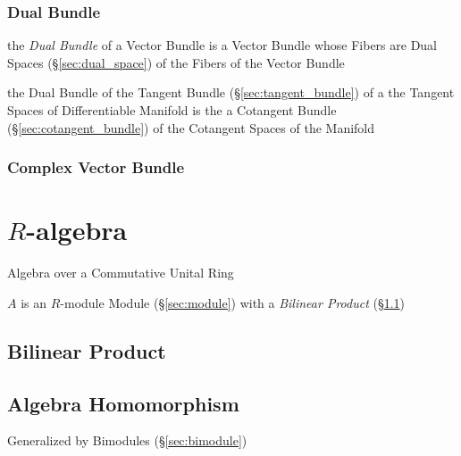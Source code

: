 \subsubsection{Dual Bundle}\label{sec:dual_bundle}

the \emph{Dual Bundle} of a Vector Bundle is a Vector Bundle whose Fibers are
Dual Spaces (\S\ref{sec:dual_space}) of the Fibers of the Vector Bundle

the Dual Bundle of the Tangent Bundle (\S\ref{sec:tangent_bundle}) of a the
Tangent Spaces of Differentiable Manifold is the a Cotangent Bundle
(\S\ref{sec:cotangent_bundle}) of the Cotangent Spaces of the Manifold



\subsubsection{Complex Vector Bundle}\label{sec:complex_vector_bundle}



\section{$R$-algebra}\label{sec:r_algebra}

Algebra over a Commutative Unital Ring

$A$ is an $R$-module Module (\S\ref{sec:module}) with a \emph{Bilinear Product}
(\S\ref{sec:bilinear_product})




\subsection{Bilinear Product}\label{sec:bilinear_product}

\subsection{Algebra Homomorphism}\label{sec:algebra_homomorphism}

Generalized by Bimodules (\S\ref{sec:bimodule})



